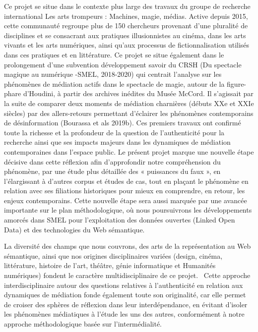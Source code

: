 \documentclass[
  a4paper,
  DIV=11,
  numbers=noendperiod]{scrreprt}
\begin{document}
Ce projet se situe dans le contexte plus large des travaux du groupe de
recherche international Les arts trompeurs : Machines, magie, médias.
Active depuis 2015, cette communauté regroupe plus de 150 chercheurs
provenant d'une pluralité de disciplines et se consacrant aux pratiques
illusionnistes au cinéma, dans les arts vivants et les arts numériques,
ainsi qu'aux processus de fictionnalisation utilisés dans ces pratiques
et en littérature. Ce projet se situe également dans le prolongement
d'une subvention développement savoir du CRSH (Du spectacle magique au
numérique -SMEL, 2018-2020) qui centrait l'analyse sur les phénomènes de
médiation actifs dans le spectacle de magie, autour de la figure-phare
d'Houdini, à partir des archives inédites du Musée McCord. Il s'agissait
par la suite de comparer deux moments de médiation charnières (débuts
XXe et XXIe siècles) par des allers-retours permettant d'éclairer les
phénomènes contemporains de désinformation (Bourassa et als 2019b). Ces
premiers travaux ont confirmé toute la richesse et la profondeur de la
question de l'authenticité pour la recherche ainsi que ses impacts
majeurs dans les dynamiques de médiation contemporaines dans l'espace
public. Le présent projet marque une nouvelle étape décisive dans cette
réflexion afin d'approfondir notre compréhension du phénomène, par une
étude plus détaillée des « puissances du faux », en l'élargissant à
d'autres corpus et études de cas, tout en plaçant le phénomène en
relation avec ses filiations historiques pour mieux en comprendre, en
retour, les enjeux contemporains. Cette nouvelle étape sera aussi
marquée par une avancée importante sur le plan méthodologique, où nous
poursuivrons les développements amorcés dans SMEL pour l'exploitation
des données ouvertes (Linked Open Data) et des technologies du Web
sémantique.~

La diversité des champs que nous couvrons, des arts de la représentation
au Web sémantique, ainsi que nos origines disciplinaires variées
(design, cinéma, littérature, histoire de l'art, théâtre, génie
informatique et Humanités numériques) fondent le caractère
multidisciplinaire de ce projet.~ Cette approche interdisciplinaire
autour des questions relatives à l'authenticité en relation aux
dynamiques de médiation fonde également toute son originalité, car elle
permet de croiser des sphères de réflexion dans leur interdépendance, en
évitant d'isoler les phénomènes médiatiques à l'étude les uns des
autres, conformément à notre approche méthodologique basée sur
l'intermédialité.
\end{document}
